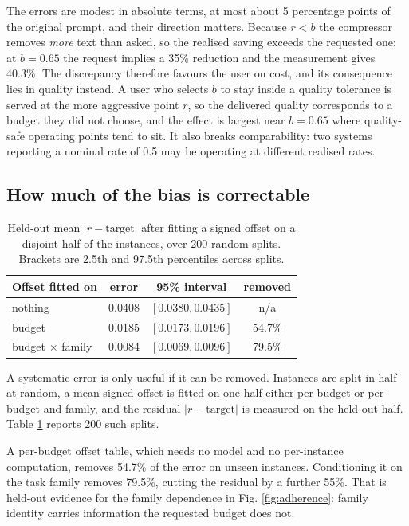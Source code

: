 \documentclass[conference]{IEEEtran}
\begin{document}
The errors are modest in absolute terms, at most about 5 percentage points of
the original prompt, and their direction matters. Because $r < b$ the
compressor removes \emph{more} text than asked, so the realised saving
exceeds the requested one: at $b=0.65$ the request implies a 35\% reduction
and the measurement gives 40.3\%. The discrepancy therefore favours the user
on cost, and its consequence lies in quality instead. A user who selects $b$
to stay inside a quality tolerance is served at the more aggressive point $r$,
so the delivered quality corresponds to a budget they did not choose, and the
effect is largest near $b=0.65$ where quality-safe operating points tend to
sit. It also breaks comparability: two systems reporting a nominal rate of 0.5
may be operating at different realised rates.

\subsection{How much of the bias is correctable}

\begin{table}[t]
\caption{Held-out mean $|r - \text{target}|$ after fitting a signed offset on
a disjoint half of the instances, over 200 random splits. Brackets are 2.5th
and 97.5th percentiles across splits.}
\label{tab:correction}
\centering
\small
\begin{tabular}{lccc}
\toprule
Offset fitted on & error & 95\% interval & removed \\
\midrule
nothing & 0.0408 & $[0.0380, 0.0435]$ & n/a \\
budget & 0.0185 & $[0.0173, 0.0196]$ & 54.7\% \\
budget $\times$ family & 0.0084 & $[0.0069, 0.0096]$ & 79.5\% \\
\bottomrule
\end{tabular}
\end{table}

A systematic error is only useful if it can be removed. Instances are split in
half at random, a mean signed offset is fitted on one half either per budget or
per budget and family, and the residual $|r - \text{target}|$ is measured on
the held-out half. Table \ref{tab:correction} reports 200 such splits.

A per-budget offset table, which needs no model and no per-instance
computation, removes 54.7\% of the error on unseen instances. Conditioning it
on the task family removes 79.5\%, cutting the residual by a further 55\%.
That is held-out evidence for the family dependence in Fig.
\ref{fig:adherence}: family identity carries information the requested budget
does not.
\end{document}
